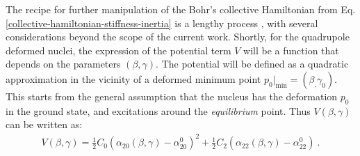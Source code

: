 The recipe for further manipulation of the Bohr's collective Hamiltonian from Eq. \ref{collective-hamiltonian-stiffness-inertia} is a lengthy process \cite{bohr1998nuclear,ring2004nuclear}, with several considerations beyond the scope of the current work. Shortly, for the quadrupole deformed nuclei, the expression of the potential term $V$ will be a function that depends on the parameters $(\beta,\gamma)$. The potential will be defined as a quadratic approximation in the vicinity of a deformed minimum point $p_0|_\text{min}=(\beta_,\gamma_0)$. This starts from the general assumption that the nucleus has the deformation $p_0$ in the ground state, and excitations around the \emph{equilibrium} point. Thus $V(\beta,\gamma)$ can be written as:
\begin{align}
    V(\beta,\gamma)=\frac{1}{2}C_{0}\left(\alpha_{20}(\beta,\gamma)-\alpha_{20}^0\right)^2+\frac{1}{2}C_{2}\left(\alpha_{22}(\beta,\gamma)-\alpha_{22}^0\right)\ .
    \label{bohr-collective-potential}
\end{align}